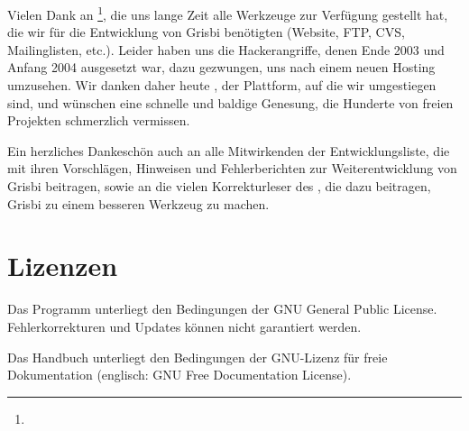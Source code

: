 Vielen Dank an \footnote{\urlTuxFamily{}}, die uns lange Zeit alle Werkzeuge zur Verfügung gestellt hat, die wir für die Entwicklung von Grisbi benötigten (Website, FTP, CVS, Mailinglisten, etc.). Leider haben uns die Hackerangriffe, denen  Ende 2003 und Anfang 2004 ausgesetzt war, dazu gezwungen, uns nach einem neuen Hosting umzusehen. Wir danken daher heute , der Plattform, auf die wir umgestiegen sind, und wünschen  eine schnelle und baldige Genesung, die Hunderte von freien Projekten schmerzlich vermissen.

Ein herzliches Dankeschön auch an alle Mitwirkenden der Entwicklungsliste, die mit ihren Vorschlägen, Hinweisen und Fehlerberichten zur Weiterentwicklung von Grisbi beitragen, sowie an die vielen Korrekturleser des , die dazu beitragen, Grisbi zu einem besseren Werkzeug zu machen.

\section{Lizenzen\label{introduction-licenses}}


Das Programm unterliegt den Bedingungen der \gls{GNU General Public License}. Fehlerkorrekturen und Updates können nicht garantiert werden.

Das Handbuch unterliegt den Bedingungen der \gls{GNU-Lizenz für freie Dokumentation} (englisch: GNU Free Documentation License).

